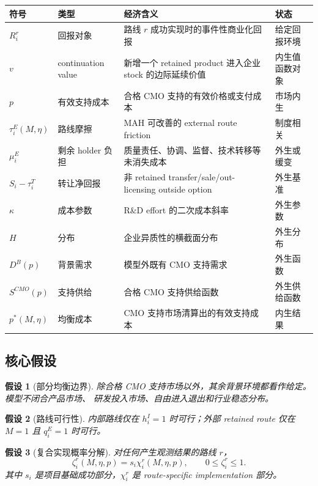 \documentclass[12pt,UTF8]{ctexart}
\theoremstyle{plain}
\newtheorem{assumption}{假设}[section]
\theoremstyle{remark}
\begin{document}
\medskip
\noindent\begin{tabularx}{\textwidth}{p{} p{} X p{}}
\toprule
符号 & 类型 & 经济含义 & 状态 \\
\midrule
$R_i^r$ & 回报对象 & 路线 $r$ 成功实现时的事件性商业化回报 & 给定回报环境 \\
$v$ & continuation value & 新增一个 retained product 进入企业 stock 的边际延续价值 & 内生值函数对象 \\
$p$ & 有效支持成本 & 合格 CMO 支持的有效价格或支付成本 & 市场内生 \\
$\tau_i^E(M,\eta)$ & 路线摩擦 & MAH 可改善的 external route friction & 制度相关 \\
$\mu_i^E$ & 剩余 holder 负担 & 质量责任、协调、监督、技术转移等未消失成本 & 外生或缓变 \\
$S_i-\tau_i^T$ & 转让净回报 & 非 retained transfer/sale/out-licensing outside option & 外生基准 \\
$\kappa$ & 成本参数 & R\&D effort 的二次成本斜率 & 外生参数 \\
$H$ & 分布 & 企业异质性的横截面分布 & 外生分布 \\
$D^B(p)$ & 背景需求 & 模型外既有 CMO 支持需求 & 外生函数 \\
$S^{CMO}(p)$ & 支持供给 & 合格 CMO 支持供给函数 & 外生供给函数 \\
$p^*(M,\eta)$ & 均衡成本 & CMO 支持市场清算出的有效支持成本 & 内生结果 \\
\bottomrule
\end{tabularx}
\endgroup

\subsection{核心假设}

\begin{assumption}[部分均衡边界]
除合格 CMO 支持市场以外，其余背景环境都看作给定。模型不闭合产品市场、
研发投入市场、自由进入退出和行业稳态分布。
\end{assumption}

\begin{assumption}[路线可行性]
内部路线仅在 $h_i^I=1$ 时可行；外部 retained route 仅在
$M=1$ 且 $q_i^E=1$ 时可行。
\end{assumption}

\begin{assumption}[复合实现概率分解]
对任何产生观测结果的路线 $r$，
\[
\zeta_i^r(M,\eta,p)=s_i\chi_i^r(M,\eta,p), \qquad 0\le \zeta_i^r\le 1.
\]
其中 $s_i$ 是项目基础成功部分，$\chi_i^r$ 是 route-specific implementation
部分。
\end{assumption}
\end{document}
